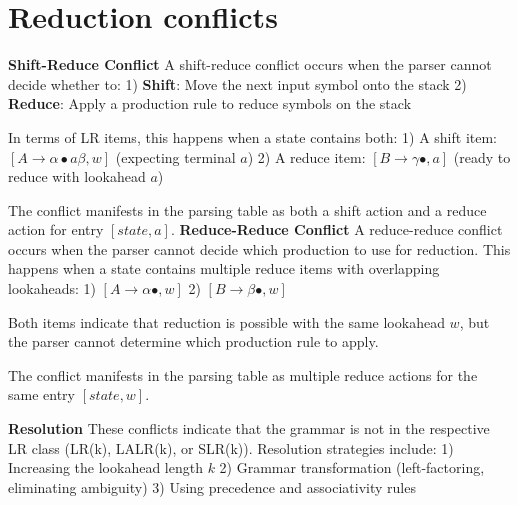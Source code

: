 \section{Reduction conflicts}

\textbf{Shift-Reduce Conflict}
A shift-reduce conflict occurs when the parser cannot decide whether to:
1) \textbf{Shift}: Move the next input symbol onto the stack
2) \textbf{Reduce}: Apply a production rule to reduce symbols on the stack


In terms of LR items, this happens when a state contains both:
1) A shift item: $[A \to \alpha \bullet a \beta, w]$ (expecting terminal $a$)
2) A reduce item: $[B \to \gamma \bullet, a]$ (ready to reduce with lookahead $a$)


The conflict manifests in the parsing table as both a shift action and a reduce action for entry $[state, a]$.
\textbf{Reduce-Reduce Conflict}
A reduce-reduce conflict occurs when the parser cannot decide which production to use for reduction. This happens when a state contains multiple reduce items with overlapping lookaheads:
1) $[A \to \alpha \bullet, w]$
2) $[B \to \beta \bullet, w]$


Both items indicate that reduction is possible with the same lookahead $w$, but the parser cannot determine which production rule to apply.

The conflict manifests in the parsing table as multiple reduce actions for the same entry $[state, w]$.

\textbf{Resolution}
These conflicts indicate that the grammar is not in the respective LR class (LR(k), LALR(k), or SLR(k)). Resolution strategies include:
1) Increasing the lookahead length $k$
2) Grammar transformation (left-factoring, eliminating ambiguity)
3) Using precedence and associativity rules
